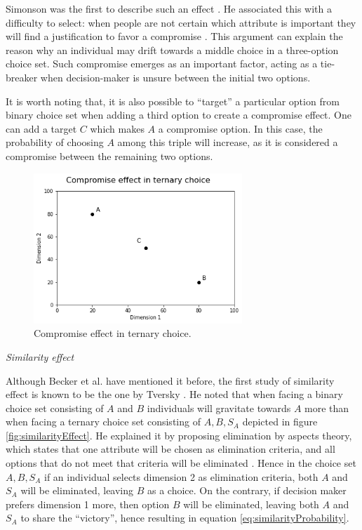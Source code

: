 \documentclass[a4paper,12pt]{article}
\newcommand{\citeyearonly}[1]{\citeyearpar{#1}}
\begin{document}
Simonson was the first to describe such an effect \citeyearonly{simonson89}. He associated this with a difficulty to select: when people are not certain which attribute is important they will find a justification to favor a compromise \citep{simonson89}. This argument can explain the reason why an individual may drift towards a middle choice in a three-option choice set. Such compromise emerges as an important factor, acting as a tie-breaker when decision-maker is unsure between the initial two options. 

It is worth noting that, it is also possible to ``target'' a particular option from binary choice set when adding a third option to create a compromise effect. One can add a target $C$ which makes $A$ a compromise option. In this case, the probability of choosing $A$ among this triple will increase, as it is considered a compromise between the remaining two options. 

\begin{figure}[h]
    \centering
    \includegraphics[width=0.7\textwidth]{staticFiles/compromiseEffect.png}
    \caption{Compromise effect in ternary choice.} %
    \label{fig:compromiseEffect} %

\end{figure}

\textit{Similarity effect}

Although Becker et al. \citeyearonly{becker1964measuring} have mentioned it before, the first study of similarity effect is known to be the one by Tversky \citep{tversky1972elimination}. He noted that when facing a binary choice set consisting of $A$ and $B$ individuals will gravitate towards $A$ more than when facing a ternary choice set consisting of ${A, B, S_A}$ depicted in figure \ref{fig:similarityEffect}. He explained it by proposing elimination by aspects theory, which states that one attribute will be chosen as elimination criteria, and all options that do not meet that criteria will be eliminated \citep{tversky1972elimination}. Hence in the choice set ${A, B, S_A}$ if an individual selects dimension 2 as elimination criteria, both $A$ and $S_A$ will be eliminated, leaving $B$ as a choice. On the contrary, if decision maker prefers dimension 1 more, then option 
$B$ will be eliminated, leaving both $A$ and $S_A$ to share the ``victory'', hence resulting in equation \ref{eq:similarityProbability}.
\end{document}
